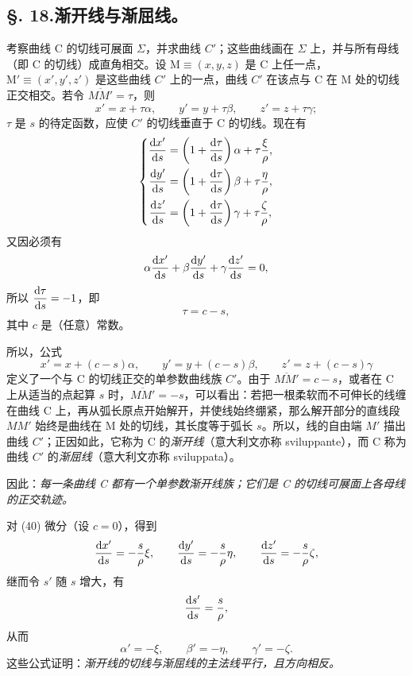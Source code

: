 \subsection*{\S. 18.\quad 渐开线与渐屈线。}
考察曲线 C 的切线可展面 \(\Sigma\)，并求曲线 \(C'\)；这些曲线画在 \(\Sigma\) 上，并与所有母线（即 C 的切线）成直角相交。设 \(\mathrm{M}\equiv(x,y,z)\) 是 C 上任一点，\(\mathrm{M'}\equiv(x',y',z')\) 是这些曲线 \(C'\) 上的一点，曲线 \(C'\) 在该点与 C 在 M 处的切线正交相交。若令 \(\overline{MM'}=\tau\)，则
\[
x'=x+\tau\alpha,
\qquad
 y'=y+\tau\beta,
\qquad
 z'=z+\tau\gamma;
\]
\(\tau\) 是 \(s\) 的待定函数，应使 \(C'\) 的切线垂直于 C 的切线。现在有
\[
\left\{
\begin{aligned}
\frac{\mathrm{d} x'}{\mathrm{d} s}&=\left(1+\frac{\mathrm{d}\tau}{\mathrm{d} s}\right)\alpha+\tau\frac{\xi}{\rho},\\
\frac{\mathrm{d} y'}{\mathrm{d} s}&=\left(1+\frac{\mathrm{d}\tau}{\mathrm{d} s}\right)\beta+\tau\frac{\eta}{\rho},\\
\frac{\mathrm{d} z'}{\mathrm{d} s}&=\left(1+\frac{\mathrm{d}\tau}{\mathrm{d} s}\right)\gamma+\tau\frac{\zeta}{\rho},
\end{aligned}\right.
\]
又因必须有
\[
\alpha\frac{\mathrm{d} x'}{\mathrm{d} s}+\beta\frac{\mathrm{d} y'}{\mathrm{d} s}+\gamma\frac{\mathrm{d} z'}{\mathrm{d} s}=0,
\]
所以 \(\dfrac{\mathrm{d}\tau}{\mathrm{d} s}=-1\)，即
\[
\tau=c-s,
\]
其中 \(c\) 是（任意）常数。

所以，公式
\begin{equation}\tag{40}
x'=x+(c-s)\alpha,
\qquad
 y'=y+(c-s)\beta,
\qquad
 z'=z+(c-s)\gamma
\end{equation}
定义了一个与 C 的切线正交的单参数曲线族 \(C'\)。由于 \(\overline{MM'}=c-s\)，或者在 C 上从适当的点起算 \(s\) 时，\(\overline{MM'}=-s\)，可以看出：若把一根柔软而不可伸长的线缠在曲线 C 上，再从弧长原点开始解开，并使线始终绷紧，那么解开部分的直线段 \(MM'\) 始终是曲线在 M 处的切线，其长度等于弧长 \(s\)。所以，线的自由端 \(M'\) 描出曲线 \(C'\)；正因如此，它称为 C 的\emph{渐开线}（意大利文亦称 sviluppante），而 C 称为曲线 \(C'\) 的\emph{渐屈线}（意大利文亦称 sviluppata）。

因此：\emph{每一条曲线 C 都有一个单参数渐开线族；它们是 C 的切线可展面上各母线的正交轨迹。}

对 (40) 微分（设 \(c=0\)），得到
\[
\frac{\mathrm{d} x'}{\mathrm{d} s}=-\frac{s}{\rho}\xi,
\qquad
\frac{\mathrm{d} y'}{\mathrm{d} s}=-\frac{s}{\rho}\eta,
\qquad
\frac{\mathrm{d} z'}{\mathrm{d} s}=-\frac{s}{\rho}\zeta,
\]
继而令 \(s'\) 随 \(s\) 增大，有
\[
\frac{\mathrm{d} s'}{\mathrm{d} s}=\frac{s}{\rho},
\]
从而
\[
\alpha'=-\xi,
\qquad
\beta'=-\eta,
\qquad
\gamma'=-\zeta.
\]
这些公式证明：\emph{渐开线的切线与渐屈线的主法线平行，且方向相反。}

